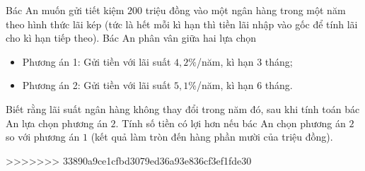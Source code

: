 \begin{ex}%
	Bác An muốn gửi tiết kiệm $200$ triệu đồng vào một ngân hàng trong một năm theo hình thức lãi kép (tức là hết mỗi kì hạn thì tiền lãi nhập vào gốc để tính lãi cho kì hạn tiếp theo). Bác An phân vân giữa hai lựa chọn
	\begin{itemize}
		\item Phương án 1: Gửi tiền với lãi suất $4{,}2\%$/năm, kì hạn $3$ tháng;
		\item Phương án 2: Gửi tiền với lãi suất $5{,}1\%$/năm, kì hạn $6$ tháng.
	\end{itemize}
	Biết rằng lãi suất ngân hàng không thay đổi trong năm đó, sau khi tính toán bác An lựa chọn phương án $2$. Tính số tiền có lợi hơn nếu bác An chọn phương án $2$ so với phương án $1$ (kết quả làm tròn đến hàng phần mười của triệu đồng).
	\par
\end{ex}
>>>>>>> 33890a9ce1cfbd3079ed36a93e836cf3ef1fde30
